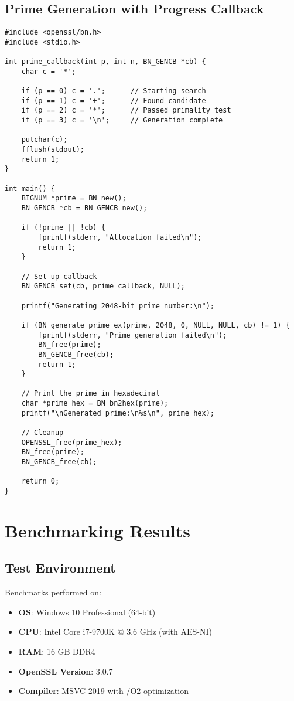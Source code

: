 \subsection{Prime Generation with Progress Callback}

\begin{verbatim}
#include <openssl/bn.h>
#include <stdio.h>

int prime_callback(int p, int n, BN_GENCB *cb) {
    char c = '*';
    
    if (p == 0) c = '.';      // Starting search
    if (p == 1) c = '+';      // Found candidate
    if (p == 2) c = '*';      // Passed primality test
    if (p == 3) c = '\n';     // Generation complete
    
    putchar(c);
    fflush(stdout);
    return 1;
}

int main() {
    BIGNUM *prime = BN_new();
    BN_GENCB *cb = BN_GENCB_new();
    
    if (!prime || !cb) {
        fprintf(stderr, "Allocation failed\n");
        return 1;
    }
    
    // Set up callback
    BN_GENCB_set(cb, prime_callback, NULL);
    
    printf("Generating 2048-bit prime number:\n");
    
    if (BN_generate_prime_ex(prime, 2048, 0, NULL, NULL, cb) != 1) {
        fprintf(stderr, "Prime generation failed\n");
        BN_free(prime);
        BN_GENCB_free(cb);
        return 1;
    }
    
    // Print the prime in hexadecimal
    char *prime_hex = BN_bn2hex(prime);
    printf("\nGenerated prime:\n%s\n", prime_hex);
    
    // Cleanup
    OPENSSL_free(prime_hex);
    BN_free(prime);
    BN_GENCB_free(cb);
    
    return 0;
}
\end{verbatim}

\section{Benchmarking Results}

\subsection{Test Environment}
Benchmarks performed on:
\begin{itemize}
    \item \textbf{OS}: Windows 10 Professional (64-bit)
    \item \textbf{CPU}: Intel Core i7-9700K @ 3.6 GHz (with AES-NI)
    \item \textbf{RAM}: 16 GB DDR4
    \item \textbf{OpenSSL Version}: 3.0.7
    \item \textbf{Compiler}: MSVC 2019 with /O2 optimization
\end{itemize}

